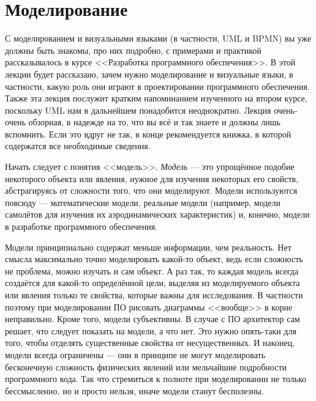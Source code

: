 \documentclass{../../text-style}
\begin{document}
\maketitle
\thispagestyle{empty}

\section{Моделирование}

С моделированием и визуальными языками (в частности, UML и BPMN) вы уже должны быть знакомы, про них подробно, с примерами и практикой рассказывалось в курсе <<Разработка программного обеспечения>>. В этой лекции будет рассказано, зачем нужно моделирование и визуальные языки, в частности, какую роль они играют в проектировании программного обеспечения. Также эта лекция послужит кратким напоминанием изученного на втором курсе, поскольку UML нам в дальнейшем понадобится неоднократно. Лекция очень-очень обзорная, в надежде на то, что вы всё и так знаете и должны лишь вспомнить. Если это вдруг не так, в конце рекомендуется книжка, в которой содержатся все необходимые сведения.

Начать следует с понятия <<модель>>. \textit{Модель} --- это упрощённое подобие некоторого объекта или явления, нужное для изучения некоторых его свойств, абстрагируясь от сложности того, что они моделируют. Модели используются повсюду --- математические модели, реальные модели (например, модели самолётов для изучения их аэродинамических характеристик) и, конечно, модели в разработке программного обеспечения.

Модели принципиально содержат меньше информации, чем реальность. Нет смысла максимально точно моделировать какой-то объект, ведь если сложность не проблема, можно изучать и сам объект. А раз так, то каждая модель всегда создаётся для какой-то определённой цели, выделяя из моделируемого объекта или явления только те свойства, которые важны для исследования. В частности поэтому при моделировании ПО рисовать диаграммы <<вообще>> в корне неправильно. Кроме того, модели субъективны. В случае с ПО архитектор сам решает, что следует показать на модели, а что нет. Это нужно опять-таки для того, чтобы отделять существенные свойства от несущественных. И наконец, модели всегда ограничены --- они в принципе не могут моделировать бесконечную сложность физических явлений или мельчайшие подробности программного кода. Так что стремиться к полноте при моделировании не только бессмысленно, но и просто нельзя, иначе модели станут бесполезны.
\end{document}
